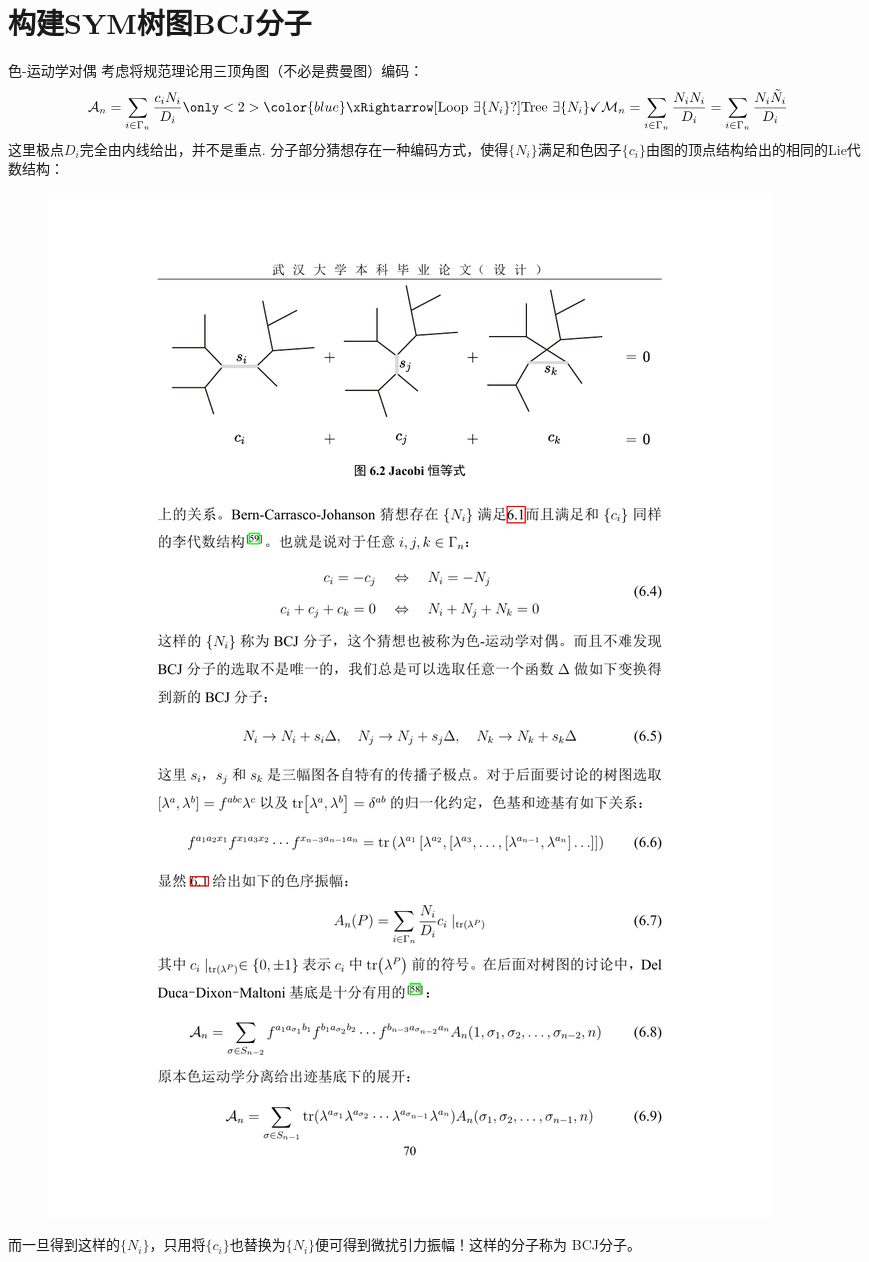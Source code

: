 \documentclass{beamer}
\begin{document}
\section{构建SYM树图BCJ分子}
\begin{frame}{色-运动学对偶}
	考虑将规范理论用三顶角图（不必是费曼图）编码：
	\begin{equation}\label{eq:9}
		\mathcal{A}_n=\sum_{i\in\Gamma_n}\frac{c_iN_i}{D_i}
		\only<2>{\color{blue} \xRightarrow[\text{Loop }\exists \{N_i\}  ?]{\text{Tree }\exists \{N_i\}  \checkmark}\mathcal{M}_n=\sum_{i\in\Gamma_n}\frac{N_iN_i}{D_i}=\sum_{i\in\Gamma_n}\frac{N_i\tilde{N}_i}{D_i}}
	\end{equation}
	这里极点$D_i$完全由内线给出，并不是重点. 分子部分\cite{Bern:2008qj}猜想存在一种编码方式，使得$\{N_i\}$满足和色因子$\{c_i\}$由图的顶点结构给出的相同的Lie代数结构：
	\begin{figure}[htpb]
		\centering
		\includegraphics[width=0.60\linewidth]{pic/2.pdf}
	\end{figure}
	而一旦得到这样的$\{N_i\}$，只用将$\{c_i\}$也替换为$\{N_i\}$便可得到微扰引力振幅！这样的分子称为{\color{WHU} BCJ分子}。
\end{frame}
\end{document}
